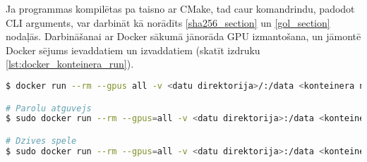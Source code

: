 Ja programmas kompilētas pa taisno ar CMake, tad caur komandrindu, padodot CLI
arguments, var darbināt kā norādīts \ref{sha256_section} un \ref{gol_section}
nodaļās. Darbināšanai ar Docker sākumā jānorāda  GPU izmantošana, un jāmontē
Docker sējums ievaddatiem un izvaddatiem (skatīt izdruku
\ref{lst:docker_konteinera_run}).

\begin{lstlisting}[caption={Docker konteinera darbināšanas konfigurācija},
  label=lst:docker_konteinera_run,
  captionpos=b,
  language=bash
]
$ docker run --rm --gpus all -v <datu direktorija>/:/data <konteinera nosaukums> /data/<apstradajamais fails> /data/<izvada fails> <citas opcijas ...>

# Parolu atguvejs 
$ sudo docker run --rm --gpus=all -v <datu direktorija>:/data <konteinera nosaukums> /data/<parolu faila cels> /data/<paroles hash vertiba> /data<zurnalfaila cels> /data/<zurnafails>

# Dzives spele 
$ sudo docker run --rm --gpus=all -v <datu direktorija>:/data <konteinera nosaukums> /data/<ieejas rezga faila cels> /data/<izejas rezga faila cels> /data<automata solu skaits> <zurnalfaila cels> 
\end{lstlisting}
